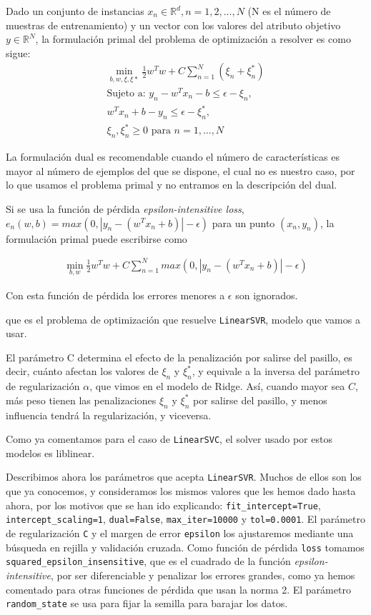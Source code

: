 \documentclass[a4]{article}
\begin{document}
Dado un conjunto de instancias $x_n\in\mathbb{R}^d, n=1,2,...,N$ (N es el número de muestras de entrenamiento) y un vector con los valores del atributo objetivo $y\in \mathbb{R}^N$, la formulación primal del problema de optimización a resolver es como sigue: 
\begin{align*}
\min\limits_{b,w,\xi,\xi*}\frac{1}{2}w^Tw + C \sum_{n=1}^{N}(\xi_n+ \xi_n^*)\\
\text{Sujeto a: }  y_n - w^Tx_n - b\leq \epsilon - \xi_n,\\
w^Tx_n + b - y_n  \leq \epsilon - \xi_n^*,\\
\xi_n, \xi_n^* \geq 0 \text{ para } n=1,...,N
\end{align*}



La formulación dual es recomendable cuando el número de características es mayor al número de ejemplos del que se dispone, el cual no es nuestro caso, por lo que usamos el problema primal y no entramos en la descripción del dual. 

Si se usa la función de pérdida \textit{epsilon-intensitive loss}, $e_n(w,b)=max(0,|y_n-(w^Tx_n+b)|-\epsilon)$ para un punto $(x_n,y_n)$, la formulación primal puede escribirse como

\begin{align*}
\min\limits_{b,w}\frac{1}{2}w^Tw + C \sum_{n=1}^{N}max(0,|y_n-(w^Tx_n+b)|-\epsilon)
\end{align*}

Con esta función de pérdida los errores menores a $\epsilon$ son ignorados. 

que es el problema de optimización que resuelve \lstinline|LinearSVR|, modelo que vamos a usar. 

El parámetro C determina el efecto de la penalización por salirse del pasillo, es decir, cuánto afectan los valores de $\xi_n$ y $ \xi_n^* $, y equivale a la inversa del parámetro de regularización $\alpha$, que vimos en el modelo de Ridge. Así, cuando mayor sea $C$, más peso tienen las penalizaciones $\xi_n$ y $ \xi_n^* $ por salirse del pasillo, y menos influencia tendrá la regularización, y viceversa. 

Como ya comentamos para el caso de \lstinline|LinearSVC|, el solver usado por estos modelos es liblinear. 

Describimos ahora los parámetros que acepta \lstinline|LinearSVR|. Muchos de ellos son los que ya conocemos, y consideramos los mismos valores que les hemos dado hasta ahora, por los motivos que se han ido explicando: \lstinline|fit_intercept=True|, \lstinline|intercept_scaling=1|, \lstinline|dual=False|, \lstinline|max_iter=10000| y \lstinline|tol=0.0001|. El parámetro de regularización \lstinline|C| y el margen de error \lstinline|epsilon| los ajustaremos mediante una búsqueda en rejilla y validación cruzada. Como función de pérdida \lstinline|loss| tomamos \lstinline|squared_epsilon_insensitive|, que es el cuadrado de la función \textit{epsilon-intensitive}, por ser diferenciable y penalizar los errores grandes, como ya hemos comentado para otras funciones de pérdida que usan la norma 2. El parámetro \lstinline|random_state| se usa para fijar la semilla para barajar los datos.  
\end{document}
